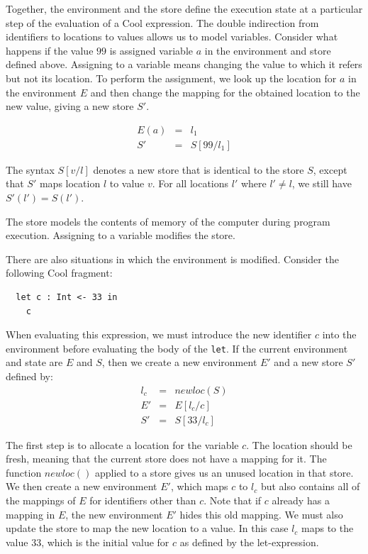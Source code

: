 \documentclass[]{article}
\begin{document}
Together, the environment and the store define the execution state at a
particular step of the evaluation of a Cool expression. The double
indirection from identifiers to locations to values allows us to model
variables. Consider what happens if the value $99$ is assigned variable
$a$ in the environment and store defined above. Assigning to a variable
means changing the value to which it refers but not its location. To
perform the assignment, we look up the location for $a$ in the
environment $E$ and then change the mapping for the obtained location to
the new value, giving a new store $S'$.

\begin{displaymath}
\begin{array}{rcl}
E(a) & = & l_1 \\
S' & = & S[99/l_1]
\end{array}\end{displaymath}

The syntax $S[v/l]$ denotes a new store that is identical to the store
$S$, except that $S'$ maps location $l$ to value $ v$. For all locations
$l'$ where $l'\not=l$, we still have $S'(l')=S(l')$.

The store models the contents of memory of the computer during program
execution. Assigning to a variable modifies the store.

There are also situations in which the environment is modified. Consider
the following Cool fragment:

\begin{verbatim}
  let c : Int <- 33 in
    c
\end{verbatim}

When evaluating this expression, we must introduce the new identifier
$c$ into the environment before evaluating the body of the \texttt{let}.
If the current environment and state are $E$ and $S$, then we create a
new environment $E'$ and a new store $S'$ defined by: \\

\begin{displaymath}
\begin{array}{rcl}
l_c & = & newloc(S)\\
E' & = & E[l_c/c]\\
S' & = & S[33/l_c]
\end{array}\end{displaymath}

The first step is to allocate a location for the variable $c$. The
location should be fresh, meaning that the current store does not have a
mapping for it. The function $newloc()$ applied to a store gives us an
unused location in that store. We then create a new environment $E'$,
which maps $c$ to $l_c$ but also contains all of the mappings of $E$ for
identifiers other than $c$. Note that if $c$ already has a mapping in
$E$, the new environment $E'$ hides this old mapping. We must also
update the store to map the new location to a value. In this case $l_c$
maps to the value $33$, which is the initial value for $c$ as defined by
the let-expression.
\end{document}
